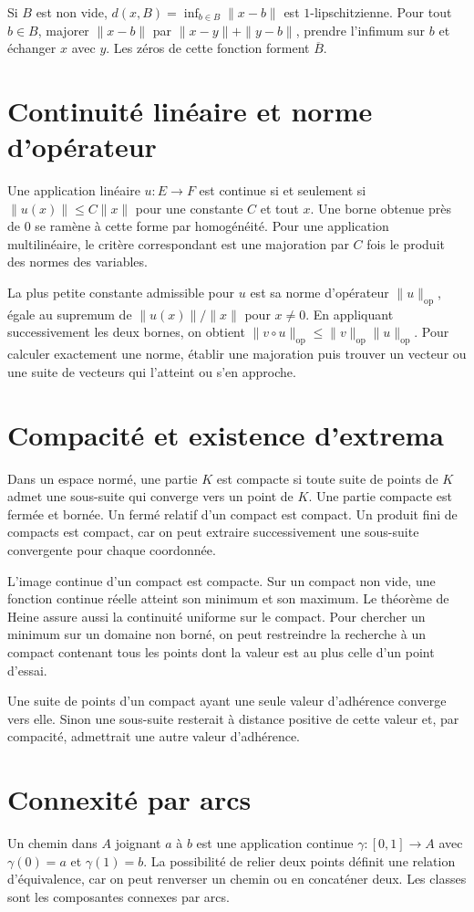 \documentclass[11pt,a4paper]{article}
\begin{document}
Si $B$ est non vide, $d(x,B)=\inf_{b\in B}\|x-b\|$ est $1$-lipschitzienne. Pour tout $b\in B$, majorer $\|x-b\|$ par $\|x-y\|+\|y-b\|$, prendre l’infimum sur $b$ et échanger $x$ avec $y$. Les zéros de cette fonction forment $\overline B$.

\section*{Continuité linéaire et norme d’opérateur}
Une application linéaire $u:E\to F$ est continue si et seulement si $\|u(x)\|\le C\|x\|$ pour une constante $C$ et tout $x$. Une borne obtenue près de $0$ se ramène à cette forme par homogénéité. Pour une application multilinéaire, le critère correspondant est une majoration par $C$ fois le produit des normes des variables.

La plus petite constante admissible pour $u$ est sa norme d’opérateur $\|u\|_{\mathrm{op}}$, égale au supremum de $\|u(x)\|/\|x\|$ pour $x\ne0$. En appliquant successivement les deux bornes, on obtient $\|v\circ u\|_{\mathrm{op}}\le\|v\|_{\mathrm{op}}\|u\|_{\mathrm{op}}$. Pour calculer exactement une norme, établir une majoration puis trouver un vecteur ou une suite de vecteurs qui l’atteint ou s’en approche.

\section*{Compacité et existence d’extrema}
Dans un espace normé, une partie $K$ est compacte si toute suite de points de $K$ admet une sous-suite qui converge vers un point de $K$. Une partie compacte est fermée et bornée. Un fermé relatif d’un compact est compact. Un produit fini de compacts est compact, car on peut extraire successivement une sous-suite convergente pour chaque coordonnée.

L’image continue d’un compact est compacte. Sur un compact non vide, une fonction continue réelle atteint son minimum et son maximum. Le théorème de Heine assure aussi la continuité uniforme sur le compact. Pour chercher un minimum sur un domaine non borné, on peut restreindre la recherche à un compact contenant tous les points dont la valeur est au plus celle d’un point d’essai.

Une suite de points d’un compact ayant une seule valeur d’adhérence converge vers elle. Sinon une sous-suite resterait à distance positive de cette valeur et, par compacité, admettrait une autre valeur d’adhérence.

\section*{Connexité par arcs}
Un chemin dans $A$ joignant $a$ à $b$ est une application continue $\gamma:[0,1]\to A$ avec $\gamma(0)=a$ et $\gamma(1)=b$. La possibilité de relier deux points définit une relation d’équivalence, car on peut renverser un chemin ou en concaténer deux. Les classes sont les composantes connexes par arcs.
\end{document}
